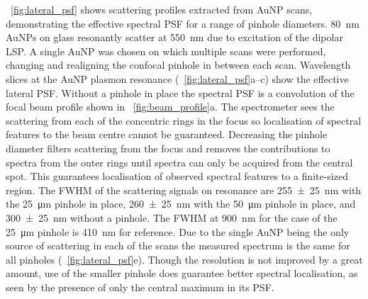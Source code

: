 \documentclass{article}
\begin{document}
\figurename~\ref{fig:lateral_psf} shows scattering profiles extracted from AuNP scans, demonstrating the effective spectral PSF for a range of pinhole diameters. \SI{80}{nm} AuNPs on glass resonantly scatter at \SI{550}{nm} due to excitation of the dipolar LSP. A single AuNP was chosen on which multiple scans were performed, changing and realigning the confocal pinhole in between each scan. Wavelength slices at the AuNP plasmon resonance (\figurename~\ref{fig:lateral_psf}a--c) show the effective lateral PSF. Without a pinhole in place the spectral PSF is a convolution of the focal beam profile shown in \figurename~\ref{fig:beam_profile}a. The spectrometer sees the scattering from each of the concentric rings in the focus so localisation of spectral features to the beam centre cannot be guaranteed. Decreasing the pinhole diameter filters scattering from the focus and removes the contributions to spectra from the outer rings until spectra can only be acquired from the central spot. This guarantees localisation of observed spectral features to a finite-sized region. The FWHM of the scattering signals on resonance are \SI{255\pm25}{nm} with the \SI{25}{\micro\metre} pinhole in place, \SI{260\pm25}{nm} with the \SI{50}{\micro\metre} pinhole in place, and \SI{300\pm25}{nm} without a pinhole.
The FWHM at \SI{900}{nm} for the case of the \SI{25}{\micro\metre} pinhole is \SI{410}{nm} for reference. Due to the single AuNP being the only source of scattering in each of the scans the measured spectrum is the same for all pinholes (\figurename~\ref{fig:lateral_psf}e). Though the resolution is not improved by a great amount, use of the smaller pinhole does guarantee better spectral localisation, as seen by the presence of only the central maximum in its PSF.
\end{document}
